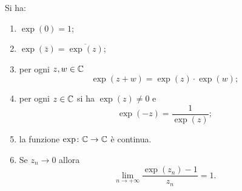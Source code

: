 \begin{theorem}
\label{th:exp_complesso}%
Si ha:
\begin{enumerate}
\item
$\displaystyle \exp(0) = 1$;

\item
$\displaystyle \exp(\bar z) = \overline{\exp(z)}$;

\item
per ogni $z,w \in \mathbb C$
\[
  \exp(z+w) = \exp(z) \cdot \exp(w);
\]

\item
per ogni $z\in \mathbb C$ si ha $\exp(z) \neq 0$ e
\[
 \exp(-z) = \frac{1}{\exp(z)};
\]

\item la funzione $\exp\colon \mathbb C \to \mathbb C$ è continua.

\item Se $z_n\to 0$ allora
\begin{equation}\label{eq:limite_exp_complesso}
   \lim_{n\to +\infty}\frac{\exp(z_n)-1}{z_n} = 1.
\end{equation}
\end{enumerate}
\end{theorem}
%
